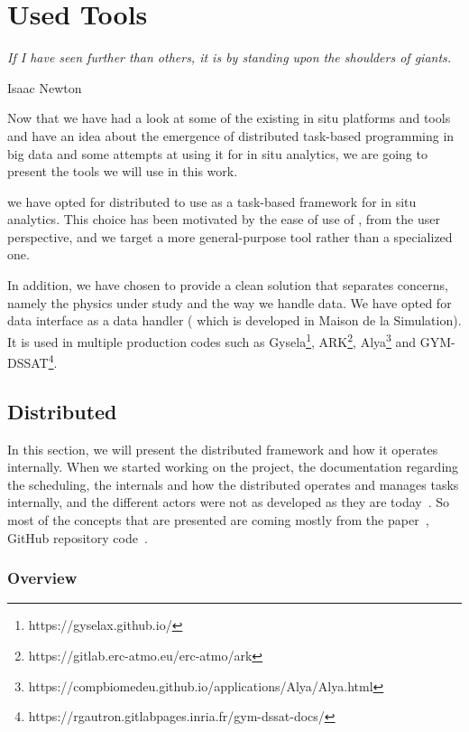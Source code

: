 \chapter{Used Tools}\label{chap:tools}

\vspace{20mm}
\epigraph{\textit{If I have seen further than others, it is by standing upon the shoulders of giants.}} {Isaac Newton}

\vfill

Now that we have had a look at some of the existing in situ platforms and tools and have an idea about the emergence of distributed task-based programming in big data and some attempts at using it for in situ analytics, we are going to present the tools we will use in this work.

we have opted for \dask distributed to use as a task-based framework for in situ analytics. This choice has been motivated by the ease of use of \dask, from the user perspective, and we target a more general-purpose tool rather than a specialized one.

In addition, we have chosen to provide a clean solution that separates concerns, namely the physics under study and the way we handle data. We have opted for \pdi data interface as a data handler ( which is developed in Maison de la Simulation). It is used in multiple production codes such as Gysela\footnote{https://gyselax.github.io/}, ARK\footnote{https://gitlab.erc-atmo.eu/erc-atmo/ark}, Alya\footnote{https://compbiomedeu.github.io/applications/Alya/Alya.html} and GYM-DSSAT\footnote{https://rgautron.gitlabpages.inria.fr/gym-dssat-docs/}.


\newpage

\section{\dask Distributed}\label{sec:dask.distributed}

In this section, we will present the \dask distributed framework and how it operates internally. 
When we started working on the project, the documentation regarding the scheduling, the internals and how the \dask distributed operates and manages tasks internally, and the different actors were not as developed as they are today~\cite{noauthor_daskdistributed_nodate}. 
So most of the concepts that are presented are coming mostly from the paper~\cite{rocklin_dask_2015}, \dask GitHub repository code~\cite{amal_distributed_2022}.

\subsection{Overview}

